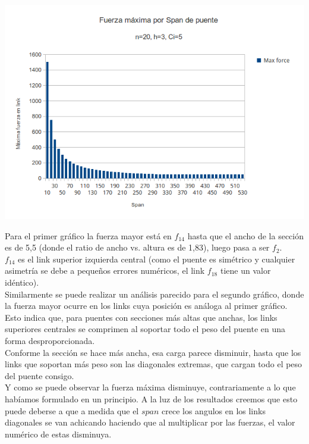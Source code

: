 \begin{center}
\includegraphics[scale=0.8]{archivos/graficos/Fuerza-x-span2.png}\\
\end{center}

Para el primer gráfico la fuerza mayor está en $f_{14}$ hasta que el ancho de la sección es de 5,5 (donde el ratio de ancho vs. altura es de 1,83), luego pasa a ser $f_2$.\\

$f_{14}$ es el link superior izquierda central (como el puente es simétrico y cualquier asimetría se debe a pequeños errores numéricos, el link $f_{18}$ tiene un valor idéntico).\\

Similarmente se puede realizar un análisis parecido para el segundo gráfico, donde la fuerza mayor ocurre en los links cuya posición es análoga al primer gráfico.\\

Esto indica que, para puentes con secciones más altas que anchas, los links superiores centrales se comprimen al soportar todo el peso del puente en una forma desproporcionada.\\

Conforme la sección se hace más ancha, esa carga parece disminuir, hasta que los links que soportan más peso son las diagonales extremas, que cargan todo el peso del puente consigo.\\

Y como se puede observar la fuerza máxima disminuye, contrariamente a lo que habíamos formulado en un principio. A la luz de los resultados creemos que esto puede deberse a que a medida que el $span$ crece los angulos en los links diagonales se van achicando haciendo que al multiplicar por las fuerzas, el valor numérico de estas disminuya.\\

